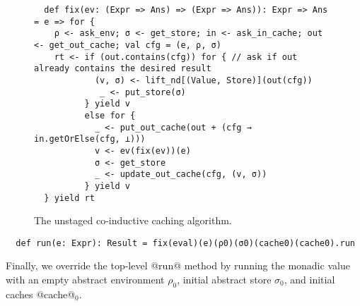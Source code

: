 \begin{figure}[h!]
  \centering
\begin{lstlisting}
  def fix(ev: (Expr => Ans) => (Expr => Ans)): Expr => Ans = e => for {
    ρ <- ask_env; σ <- get_store; in <- ask_in_cache; out <- get_out_cache; val cfg = (e, ρ, σ)
    rt <- if (out.contains(cfg)) for { // ask if out already contains the desired result
            (v, σ) <- lift_nd[(Value, Store)](out(cfg))
             _ <- put_store(σ)
          } yield v
          else for {
            _ <- put_out_cache(out + (cfg → in.getOrElse(cfg, ⊥)))
            v <- ev(fix(ev))(e)
            σ <- get_store
            _ <- update_out_cache(cfg, (v, σ))
          } yield v
  } yield rt
\end{lstlisting}
\vspace{-1em}
\caption{The unstaged co-inductive caching algorithm.}
\label{fig:coind_cache}
\end{figure}

\begin{lstlisting}
  def run(e: Expr): Result = fix(eval)(e)(ρ0)(σ0)(cache0)(cache0).run
\end{lstlisting}

Finally, we override the top-level @run@ method by running the monadic value
with an empty abstract environment $\rho_0$, initial abstract store $\sigma_0$,
and initial caches @cache@$_0$.
